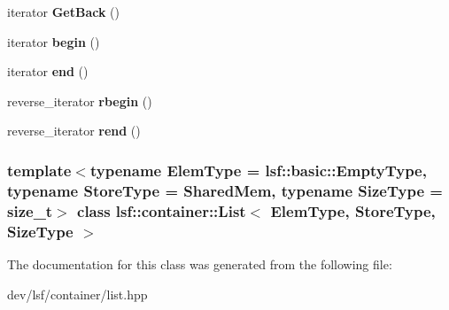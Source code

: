 \begin{DoxyCompactItemize}
\item 
\hypertarget{classlsf_1_1container_1_1List_aa58c0f86a0a46e3b3878ac990de0b2c5}{
iterator {\bfseries GetBack} ()}
\label{classlsf_1_1container_1_1List_aa58c0f86a0a46e3b3878ac990de0b2c5}

\item 
\hypertarget{classlsf_1_1container_1_1List_a78dea9b87564d39ebe811239822d537a}{
iterator {\bfseries begin} ()}
\label{classlsf_1_1container_1_1List_a78dea9b87564d39ebe811239822d537a}

\item 
\hypertarget{classlsf_1_1container_1_1List_a16a74e517082b29bec47fc26d7186498}{
iterator {\bfseries end} ()}
\label{classlsf_1_1container_1_1List_a16a74e517082b29bec47fc26d7186498}

\item 
\hypertarget{classlsf_1_1container_1_1List_ae1278e2a8ea48485cdbb8907ba25265a}{
reverse\_\-iterator {\bfseries rbegin} ()}
\label{classlsf_1_1container_1_1List_ae1278e2a8ea48485cdbb8907ba25265a}

\item 
\hypertarget{classlsf_1_1container_1_1List_acef3625dc1aa09c4c941710410d7f592}{
reverse\_\-iterator {\bfseries rend} ()}
\label{classlsf_1_1container_1_1List_acef3625dc1aa09c4c941710410d7f592}

\end{DoxyCompactItemize}
\subsubsection*{template$<$typename ElemType = lsf::basic::EmptyType, typename StoreType = SharedMem, typename SizeType = size\_\-t$>$ class lsf::container::List$<$ ElemType, StoreType, SizeType $>$}



The documentation for this class was generated from the following file:\begin{DoxyCompactItemize}
\item 
dev/lsf/container/list.hpp\end{DoxyCompactItemize}
